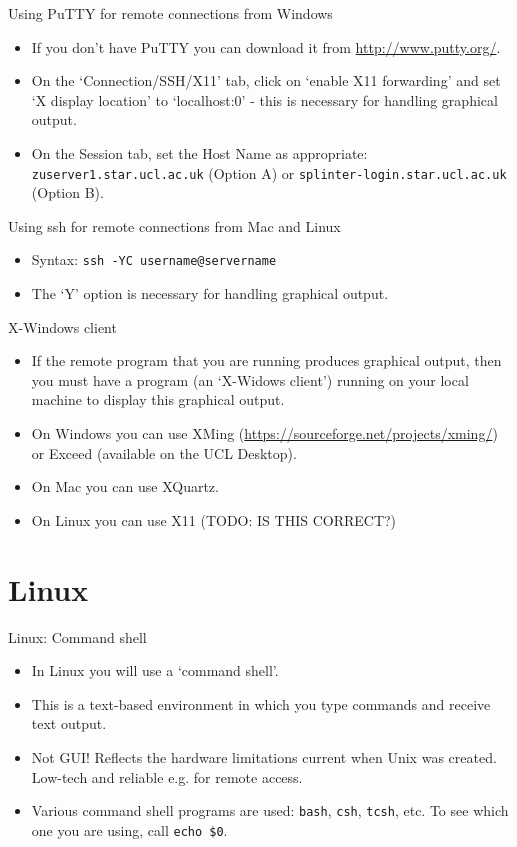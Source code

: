 \documentclass{beamer}
\begin{document}
\begin{frame}{Using PuTTY for remote connections from Windows}
  \begin{itemize}
    \item If you don't have PuTTY you can download it from \url{http://www.putty.org/}.
    \item On the `Connection/SSH/X11' tab, click on `enable X11 forwarding' and set `X display location' to `localhost:0' - this is necessary for handling graphical output.
    \item On the Session tab, set the Host Name as appropriate: \texttt{zuserver1.star.ucl.ac.uk} (Option A) or \texttt{splinter-login.star.ucl.ac.uk} (Option B).
  \end{itemize}
\end{frame}

\begin{frame}{Using ssh for remote connections from Mac and Linux}
  \begin{itemize}
    \item Syntax: \alert{\texttt{ssh -YC username@servername}}
    \item The `Y' option is necessary for handling graphical output.
  \end{itemize}
\end{frame}

\begin{frame}{X-Windows client}
  \begin{itemize}
    \item If the remote program that you are running produces graphical output, then you must have a program (an `X-Widows client') running on your local machine to display this graphical output.
    \item On Windows you can use XMing (\url{https://sourceforge.net/projects/xming/}) or Exceed (available on the UCL Desktop).
    \item On Mac you can use XQuartz.
    \item On Linux you can use X11 (TODO: IS THIS CORRECT?)
  \end{itemize}
\end{frame}


\section{Linux}

\begin{frame}{Linux: Command shell}
  \begin{itemize}
    \item{In Linux you will use a `command shell'.}
    \item{This is a text-based environment in which you type commands and receive text output.}
    \item{Not GUI! Reflects the hardware limitations current when Unix was created. Low-tech and reliable e.g. for remote access.}
    \item{Various command shell programs are used: \texttt{bash}, \texttt{csh}, \texttt{tcsh}, etc. To see which one you are using, call \texttt{echo \$0}.}
   \end{itemize}
\end{frame}
\end{document}
